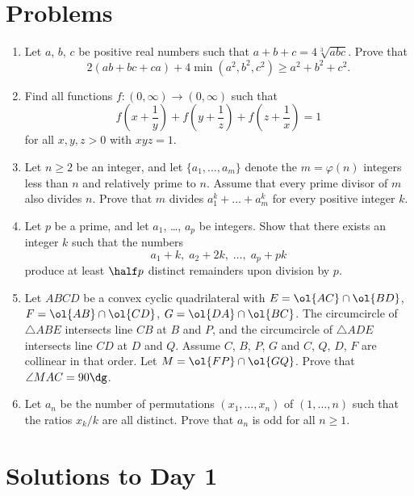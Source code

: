 \documentclass[11pt]{scrartcl}
\begin{document}
\section{Problems}
\begin{enumerate}[\bfseries 1.]
\item %
Let $a$, $b$, $c$ be positive real numbers such that $a+b+c = 4\sqrt[3]{abc}$.
Prove that
\[ 2(ab+bc+ca) + 4 \min (a^2, b^2, c^2) \ge a^2 + b^2 + c^2. \]

\item %
Find all functions $f \colon (0,\infty) \to (0,\infty)$ such that
\[
  f\left( x+\frac 1y \right)
  + f\left( y+\frac 1z \right)
  + f\left( z+\frac 1x \right)
  = 1
\]
for all $x,y,z > 0$ with $xyz = 1$.

\item %
Let $n \ge 2$ be an integer, and let $\{a_1, \dots, a_m\}$ denote
the $m = \varphi(n)$ integers less than $n$ and relatively prime to $n$.
Assume that every prime divisor of $m$ also divides $n$.
Prove that $m$ divides $a_1^k + \dots + a_m^k$ for every positive
integer $k$.

\item %
Let $p$ be a prime, and let $a_1$, \dots, $a_p$ be integers.
Show that there exists an integer $k$ such that the numbers
\[ a_1 + k, \; a_2 + 2k, \; \dots, \; a_p + pk \]
produce at least $\half p$ distinct remainders upon division by $p$.

\item %
Let $ABCD$ be a convex cyclic quadrilateral with
$E = \ol{AC} \cap \ol{BD}$, $F = \ol{AB} \cap \ol{CD}$,
$G = \ol{DA} \cap \ol{BC}$.
The circumcircle of $\triangle ABE$
intersects line $CB$ at $B$ and $P$,
and the circumcircle of $\triangle ADE$
intersects line $CD$ at $D$ and $Q$.
Assume $C$, $B$, $P$, $G$
and $C$, $Q$, $D$, $F$ are collinear in that order.
Let $M = \ol{FP} \cap \ol{GQ}$.
Prove that $\angle MAC = 90\dg$.

\item %
Let $a_n$ be the number of permutations $(x_1, \dots, x_n)$ of $(1, \dots, n)$
such that the ratios $x_k / k$ are all distinct.
Prove that $a_n$ is odd for all $n \ge 1$.

\end{enumerate}
\pagebreak

\section{Solutions to Day 1}
\end{document}
